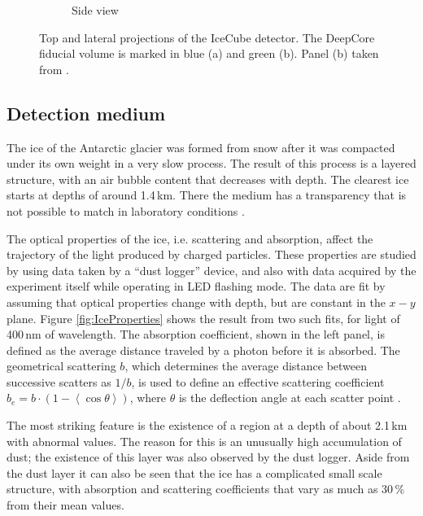 \documentclass[../Main.tex]{subfiles}
\begin{document}
\begin{figure}[bth]
\begin{subfigure}[c]{0.49\textwidth}
    \caption{Side view}
    \label{fig:ICsideview}
  \end{subfigure}
  \caption[Schematic projections of the IceCube detector.]{Top and lateral projections of the IceCube detector. The DeepCore fiducial volume is marked in blue (a) and green (b). Panel (b) taken from \cite{deepcore_capabilities}.}
  \label{fig:ICschematic}
\end{figure}


\subsection{Detection medium}
\label{sec:DetectionMedium}
The ice of the Antarctic glacier was formed from snow after it was compacted under its own weight in a very slow process. The result of this process is a layered structure, with an air bubble content that decreases with depth. The clearest ice starts at depths of around 1.4\,km. There the medium has a transparency that is not possible to match in laboratory conditions \cite{ice1}.

The optical properties of the ice, i.e. scattering and absorption, affect the trajectory of the light produced by charged particles. These properties are studied by using data taken by a ``dust logger'' device, and also with data acquired by the experiment itself while operating in LED flashing mode. The data are fit by assuming that optical properties change with depth, but are constant in the $x-y$ plane. Figure \ref{fig:IceProperties} shows the result from two such fits, for light of 400\,nm of wavelength. The absorption coefficient, shown in the left panel, is defined as the average distance traveled by a photon before it is absorbed. The geometrical scattering $b$, which determines the average distance between successive scatters as $1/b$, is used to define an effective scattering coefficient $b_e = b\cdot (1-\left<\cos\theta\right>)$, where $\theta$ is the deflection angle at each scatter point \cite{ice2}.

The most striking feature is the existence of a region at a depth of about 2.1\,km with abnormal values. The reason for this is an unusually high accumulation of dust; the existence of this layer was also observed by the dust logger. Aside from the dust layer it can also be seen that the ice has a complicated small scale structure, with absorption and scattering coefficients that vary as much as 30\,\% from their mean values.
\end{document}
